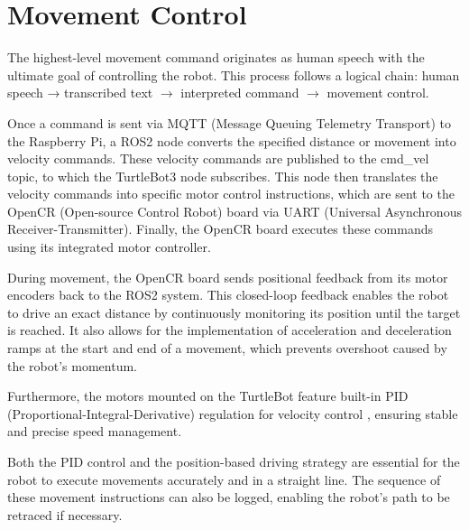 \section{Movement Control}


The highest-level movement command originates as human speech with the ultimate goal of controlling the robot. This process follows a logical chain: human speech → transcribed text $\rightarrow$ interpreted command $\rightarrow$ movement control.

Once a command is sent via MQTT (Message Queuing Telemetry Transport) to the Raspberry Pi, a ROS2 node converts the specified distance or movement into velocity commands. These velocity commands are published to the cmd\_vel topic, to which the TurtleBot3 node subscribes. This node then translates the velocity commands into specific motor control instructions, which are sent to the OpenCR (Open-source Control Robot) board via UART (Universal Asynchronous Receiver-Transmitter). Finally, the OpenCR board executes these commands using its integrated motor controller.

During movement, the OpenCR board sends positional feedback from its motor encoders back to the ROS2 system. This closed-loop feedback enables the robot to drive an exact distance by continuously monitoring its position until the target is reached. It also allows for the implementation of acceleration and deceleration ramps at the start and end of a movement, which prevents overshoot caused by the robot's momentum.

Furthermore, the motors mounted on the TurtleBot feature built-in PID (Proportional-Integral-Derivative) regulation for velocity control \cite{motor_Specifications}, ensuring stable and precise speed management.

Both the PID control and the position-based driving strategy are essential for the robot to execute movements accurately and in a straight line. The sequence of these movement instructions can also be logged, enabling the robot's path to be retraced if necessary.